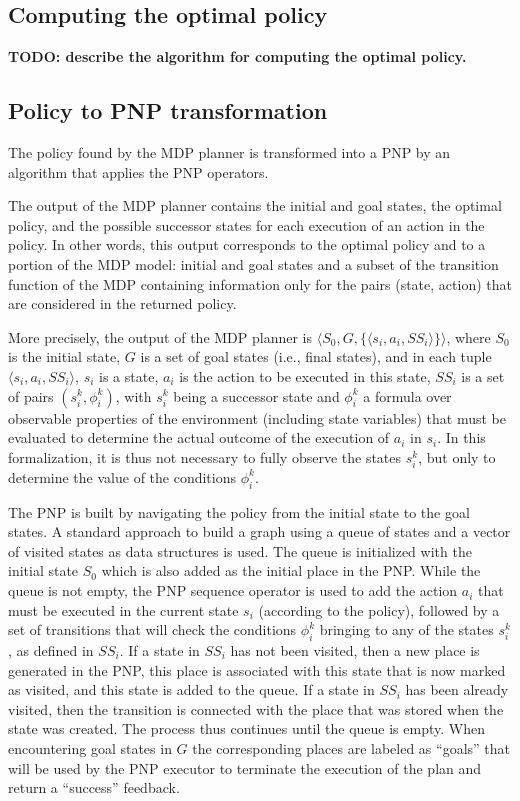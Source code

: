 \subsection{Computing the optimal policy}

{\bf TODO: describe the algorithm for computing the optimal policy.}




\subsection{Policy to PNP transformation}

The policy found by the MDP planner is transformed into a PNP by an algorithm that applies the PNP operators. 

The output of the MDP planner contains the initial and goal states,  the optimal policy, and the possible successor states for each execution of an action in the policy. In other words, this output corresponds to the optimal policy and to a portion of the MDP model: initial and goal states and a subset of the transition function of the MDP containing information only for the pairs (state, action) that are considered in the returned policy.

More precisely, the output of the MDP planner is $\langle S_0, G, \{ \langle s_i, a_i, SS_i \rangle \} \rangle $,  
where $S_0$ is the initial state, $G$ is a set of goal states (i.e., final states),
and in each tuple $\langle s_i, a_i, SS_i \rangle$, $s_i$ is a state, $a_i$ is the action to be executed in this state, $SS_i$ is a set of pairs $(s_i^k, \phi_i^k)$, with $s_i^k$ being a successor state and $\phi_i^k$ a formula over observable properties of the environment (including state variables) that  must be evaluated to determine the actual outcome of the execution of $a_i$ in $s_i$.
In this formalization, it is thus not necessary to fully observe the states $s_i^k$, but only to determine the value of the conditions $\phi_i^k$.

The PNP is built by navigating the policy from the initial state to the goal states.
A standard approach to build a graph using a queue of states and a vector of visited states as data structures is used.
The queue is initialized with the initial state $S_0$ which is also added as the initial place in the PNP.
While the queue is not empty, the PNP sequence operator is used to add the action $a_i$ that must be executed in the current state $s_i$ (according to the policy), followed by a set of transitions that will check the conditions $\phi_i^k$ bringing to any of the states $s_i^k$, as defined in $SS_i$. 
If a state in $SS_i$ has not been visited, then a new place is generated in the PNP, this place is associated with this state that is now marked as visited, and this state is added to the queue. If a state in $SS_i$ has been already visited, then the transition is connected with the place that was stored when the state was created. The process thus continues until the queue is empty.
When encountering goal states in $G$ the corresponding places are labeled as ``goals'' that will be used by the PNP executor to terminate the execution of the plan and return a ``success'' feedback.

